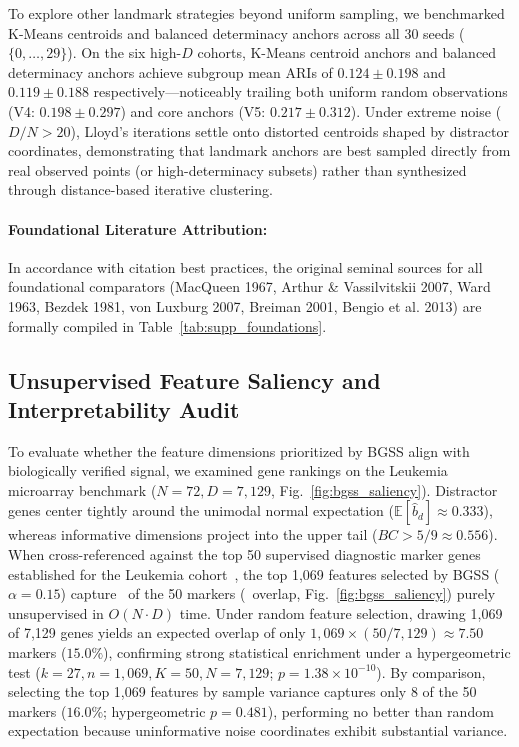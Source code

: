 \documentclass[pdflatex,sn-mathphys-num]{sn-jnl}
\theoremstyle{thmstyleone}
\theoremstyle{thmstyletwo}
\theoremstyle{thmstylethree}
\begin{document}
To explore other landmark strategies beyond uniform sampling, we benchmarked K-Means centroids and balanced determinacy anchors across all 30 seeds ($\{0, \dots, 29\}$). On the six high-$D$ cohorts, K-Means centroid anchors and balanced determinacy anchors achieve subgroup mean ARIs of $0.124 \pm 0.198$ and $0.119 \pm 0.188$ respectively---noticeably trailing both uniform random observations (V4: $0.198 \pm 0.297$) and core anchors (V5: $0.217 \pm 0.312$). Under extreme noise ($D/N > 20$), Lloyd's iterations settle onto distorted centroids shaped by distractor coordinates, demonstrating that landmark anchors are best sampled directly from real observed points (or high-determinacy subsets) rather than synthesized through distance-based iterative clustering.

\paragraph{Foundational Literature Attribution:}
In accordance with citation best practices, the original seminal sources for all foundational comparators (MacQueen 1967, Arthur \& Vassilvitskii 2007, Ward 1963, Bezdek 1981, von Luxburg 2007, Breiman 2001, Bengio et al. 2013) are formally compiled in Table~\ref{tab:supp_foundations}.



\subsection{Unsupervised Feature Saliency and Interpretability Audit}\label{sec:ablation_saliency}
To evaluate whether the feature dimensions prioritized by BGSS align with biologically verified signal, we examined gene rankings on the Leukemia microarray benchmark ($N=72, D=7{,}129$, Fig.~\ref{fig:bgss_saliency}). Distractor genes center tightly around the unimodal normal expectation ($\mathbb{E}[\hat{b}_d] \approx 0.333$), whereas informative dimensions project into the upper tail ($BC > 5/9 \approx 0.556$). When cross-referenced against the top 50 supervised diagnostic marker genes established for the Leukemia cohort~\cite{golub1999molecular}, the top 1,069 features selected by BGSS ($\alpha = 0.15$) capture \AblationLeukemiaMarkerFiftyCount\ of the 50 markers (\AblationLeukemiaMarkerFiftyFraction\ overlap, Fig.~\ref{fig:bgss_saliency}) purely unsupervised in $O(N \cdot D)$ time. Under random feature selection, drawing 1,069 of 7,129 genes yields an expected overlap of only $1{,}069 \times (50 / 7{,}129) \approx 7.50$ markers ($15.0\%$), confirming strong statistical enrichment under a hypergeometric test ($k=27, n=1{,}069, K=50, N=7{,}129$; $p = 1.38 \times 10^{-10}$). By comparison, selecting the top 1,069 features by sample variance captures only 8 of the 50 markers ($16.0\%$; hypergeometric $p = 0.481$), performing no better than random expectation because uninformative noise coordinates exhibit substantial variance.
\end{document}
